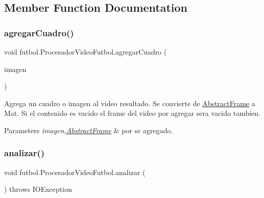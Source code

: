 \subsection{Member Function Documentation}
\hypertarget{classfutbol_1_1_procesador_video_futbol_a8f17a8a5d4fc5d6d3eed46e427284b90}{}\label{classfutbol_1_1_procesador_video_futbol_a8f17a8a5d4fc5d6d3eed46e427284b90} 
\subsubsection{\texorpdfstring{agregar\+Cuadro()}{agregarCuadro()}}
{\footnotesize\ttfamily void futbol.\+Procesador\+Video\+Futbol.\+agregar\+Cuadro (\begin{DoxyParamCaption}\item[{\hyperlink{classfutbol_1_1_abstract_frame}{Abstract\+Frame}}]{imagen }\end{DoxyParamCaption})\hspace{0.3cm}{\ttfamily [private]}}

Agrega un cuadro o imagen al video resultado. Se convierte de \hyperlink{classfutbol_1_1_abstract_frame}{Abstract\+Frame} a Mat. Si el contenido es vacido el frame del video por agregar sera vacido tambien. 
\begin{DoxyParams}{Parameters}
{\em imagen,\hyperlink{classfutbol_1_1_abstract_frame}{Abstract\+Frame}} & por se agregado. \\
\hline
\end{DoxyParams}
\hypertarget{classfutbol_1_1_procesador_video_futbol_a5dc72e3ebc5e66187d71face1f2c4820}{}\label{classfutbol_1_1_procesador_video_futbol_a5dc72e3ebc5e66187d71face1f2c4820} 
\subsubsection{\texorpdfstring{analizar()}{analizar()}}
{\footnotesize\ttfamily void futbol.\+Procesador\+Video\+Futbol.\+analizar (\begin{DoxyParamCaption}{ }\end{DoxyParamCaption}) throws I\+O\+Exception}

